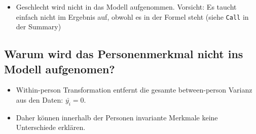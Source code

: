 \documentclass[
]{book}
\newenvironment{Shaded}{\begin{snugshade}}{\end{snugshade}}
\newcommand{\DataTypeTok}[1]{\textcolor[rgb]{0.13,0.29,0.53}{#1}}
\newcommand{\DecValTok}[1]{\textcolor[rgb]{0.00,0.00,0.81}{#1}}
\newcommand{\FloatTok}[1]{\textcolor[rgb]{0.00,0.00,0.81}{#1}}
\newcommand{\KeywordTok}[1]{\textcolor[rgb]{0.13,0.29,0.53}{\textbf{#1}}}
\newcommand{\NormalTok}[1]{#1}
\newcommand{\OperatorTok}[1]{\textcolor[rgb]{0.81,0.36,0.00}{\textbf{#1}}}
\newcommand{\OtherTok}[1]{\textcolor[rgb]{0.56,0.35,0.01}{#1}}
\newcommand{\StringTok}[1]{\textcolor[rgb]{0.31,0.60,0.02}{#1}}
\providecommand{\tightlist}{%
  \setlength{\itemsep}{0pt}\setlength{\parskip}{0pt}}
\begin{document}
\begin{itemize}
\tightlist
\item
  Geschlecht wird nicht in das Modell aufgenommen. Vorsicht: Es taucht einfach nicht im Ergebnis auf, obwohl es in der Formel steht (siehe \texttt{Call} in der Summary)
\end{itemize}

\hypertarget{warum-wird-das-personenmerkmal-nicht-ins-modell-aufgenomen}{%
\subsection*{Warum wird das Personenmerkmal nicht ins Modell aufgenomen?}\label{warum-wird-das-personenmerkmal-nicht-ins-modell-aufgenomen}}

\begin{itemize}
\tightlist
\item
  Within-person Transformation entfernt die gesamte between-person Varianz aus den Daten: \(\bar{y_{i}} = 0\).
\item
  Daher können innerhalb der Personen invariante Merkmale keine Unterschiede erklären.
\end{itemize}

\begin{Shaded}
\end{Shaded}
\end{document}
